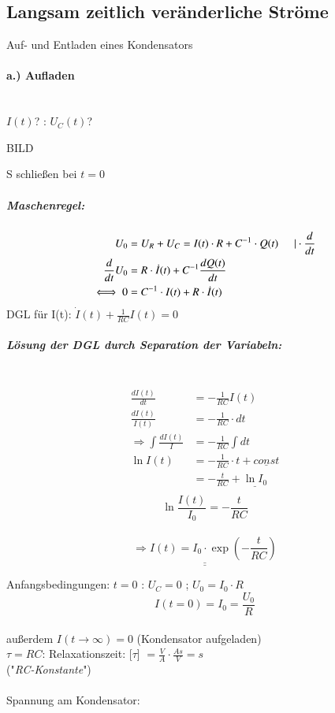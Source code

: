 \subsection{Langsam zeitlich veränderliche Ströme}

Auf- und Entladen eines Kondensators

\paragraph{a.) Aufladen} \hfill \\

$ I(t) $? : $ U_C(t) $?

BILD

S schließen bei $ t=0 $

	\subparagraph{Maschenregel:}
		\begin{align*}
			U_0& = U_R+U_C = I(t) \cdot R + C^{-1} \cdot Q(t)  \hspace{5mm} | \cdot \frac{d}{dt} \\
			\frac{d}{dt} U_0 &=R \cdot \dot{I}(t) + C^{-1} \frac{dQ(t)}{dt} \\
			\iff 0 &= C^{-1} \cdot I(t) + R \cdot \dot{I}(t) 
		\end{align*}
		DGL für I(t): $ \boxed{\dot{I}(t) + \frac{1}{RC} I(t) = 0} $ \\
		
	\subparagraph{Lösung der DGL durch Separation der Variabeln:}\hfill \\
		\begin{align*}
		\frac{dI(t)}{dt} &= - \frac{1}{RC} I(t)\\
		\frac{dI(t)}{I(t)} &= - \frac{1}{RC} \cdot dt \\
		\Rightarrow \int \frac{dI(t)}{I} &= - \frac{1}{RC} \int dt \\
		\ln I(t) &= - \frac{1}{RC} \cdot t + \underline{const} \\
		&= - \frac{t}{RC} + \underline{\ln I_0} \\
		\end{align*}
		$$\ln\frac{I(t)}{I_0} = -\frac{t}{RC}$$ \\ 
		$$\underline{\underline{\Rightarrow I(t) = I_0 \cdot \exp(-\frac{t}{RC})}}$$
		
	Anfangsbedingungen: $ t=0 $ : $ U_C = 0 $ ; $ U_0 = I_0 \cdot R $ \\
	$$ I(t=0) = I_0 = \frac{U_0}{R}  $$ \\
	außerdem $ I (t\rightarrow\infty) = 0 $ (Kondensator aufgeladen) \\
	$ \tau=RC $: Relaxationszeit: [$ \tau $] $ = \frac{V}{A} \cdot \frac{As}{V} = s $ \\
	("\emph{RC-Konstante}") \\
	\hfill \\
	Spannung am Kondensator:

		